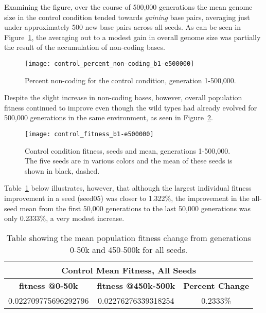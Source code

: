 Examining the figure, over the course of 500,000 generations the mean genome size in the control condition tended towards \textit{gaining} base pairs, averaging just under approximately 500 new base pairs across all seeds. As can be seen in Figure~\ref{fig:control_perc_non-coding}, the averaging out to a modest gain in overall genome size was partially the result of the accumulation of non-coding bases.

\begin{figure}[h]
	\texttt{[image: control\_percent\_non-coding\_b1-e500000]}
	\caption[Control condition percent non-coding]{Percent non-coding for the control condition, generation 1-500,000.}
	\label{fig:control_perc_non-coding}
\end{figure}
Despite the slight increase in non-coding bases, however, overall population fitness continued to improve even though the wild types had already evolved for 500,000 generations in the same environment, as seen in Figure~\ref{fig:control_fitness}.

\begin{figure}[h]
	\texttt{[image: control\_fitness\_b1-e500000]}
	\caption[Control condition fitness]{Control condition fitness, seeds and mean, generations 1-500,000. The five seeds are in various colors and the mean of these seeds is shown in black, dashed.}
	\label{fig:control_fitness}
\end{figure}

Table~\ref{table:control_mean_fitness_change} below illustrates, however, that although the largest individual fitness improvement in a seed (seed05) was closer to 1.322\%, the improvement in the all-seed mean from the first 50,000 generations to the last 50,000 generations was only 0.2333\%, a very modest increase. 

\begin{table}[H]
	\centering
	\begin{tabular}{|c|c|c|}
		\hline
		\multicolumn{3}{|c|}{\Large \textbf{Control Mean Fitness, All Seeds}} \\
		\hline
		\textbf{fitness @0-50k} & \textbf{fitness @450k-500k} & \textbf{Percent Change} \\
		\hline \hline
		0.022709775696292796 & 0.02276276339318254 & 0.2333\%  \\
		\hline
		
	\end{tabular}
	\caption[Control Population Mean Fitness, Gens 0-50k, 450k-500k]{Table showing the mean population fitness change from generations 0-50k and 450-500k for all seeds.}
	\label{table:control_mean_fitness_change}
\end{table}

